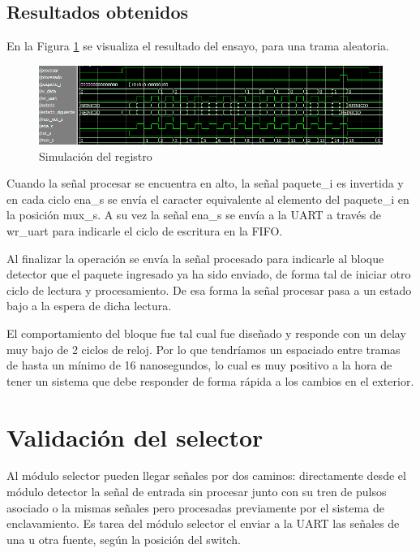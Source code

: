 	\subsection{Resultados obtenidos}
				
		En la Figura \ref{fig:Test_Registro} se visualiza el resultado del ensayo, para una trama aleatoria.
		
	\begin{figure}[h]
	\centering
	\includegraphics[scale=0.6]{./Figures/Test/Registro}
		\caption{Simulación del registro}
		\label{fig:Test_Registro}
	\end{figure}
	
	Cuando la señal procesar se encuentra en alto, la señal paquete\_i es invertida y en cada ciclo ena\_s se envía el caracter equivalente al elemento del paquete\_i en la posición mux\_s. A su vez la señal ena\_s se envía a la UART a través de wr\_uart para indicarle el ciclo de escritura en la FIFO.
	
	Al finalizar la operación se envía la señal procesado para indicarle al bloque detector que el paquete ingresado ya ha sido enviado, de forma tal de iniciar otro ciclo de lectura y procesamiento. De esa forma la señal procesar pasa a un estado bajo a la espera de dicha lectura.
	
	El comportamiento del bloque fue tal cual fue diseñado y responde con un delay muy bajo de 2 ciclos de reloj. Por lo que tendríamos un espaciado entre tramas de hasta un mínimo de 16 nanosegundos, lo cual es muy positivo a la hora de tener un sistema que debe responder de forma rápida a los cambios en el exterior.	
	
\section{Validación del selector}

	Al módulo selector pueden llegar señales por dos caminos: directamente desde el módulo detector la señal de entrada sin procesar junto con su tren de pulsos asociado o la mismas señales pero procesadas previamente por el sistema de enclavamiento. Es tarea del módulo selector el enviar a la UART las señales de una u otra fuente, según la posición del switch.	
	
